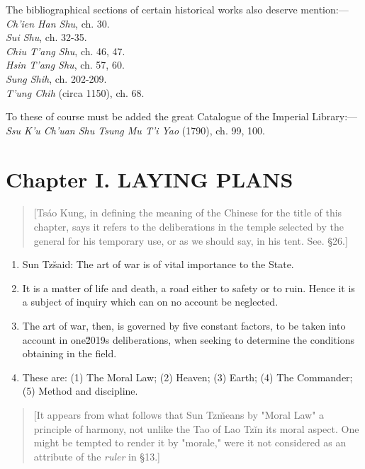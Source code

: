 \documentclass[10pt,a4paper]{book}
\begin{document}
The bibliographical sections of certain historical works also deserve mention:---
\noindent\textit{Ch’ien Han Shu}, ch. 30. \\
\textit{Sui Shu}, ch. 32-35. \\
\textit{Chiu T’ang Shu}, ch. 46, 47. \\
\textit{Hsin T’ang Shu}, ch. 57, 60. \\
\textit{Sung Shih}, ch. 202-209. \\
\textit{T’ung Chih} (circa 1150), ch. 68.

To these of course must be added the great Catalogue of the Imperial Library:--- \\
\indent\textit{Ssu K’u Ch’uan Shu Tsung Mu T’i Yao} (1790), ch. 99, 100.

\chapter{Chapter I. LAYING PLANS}

{\small
\begin{quote}
[Ts\'ao Kung, in defining the meaning of the Chinese for the title of this chapter, says it refers to the deliberations in the temple selected by the general for his temporary use, or as we should say, in his tent. See. \S 26.]
\end{quote}
}

\begin{enumerate}[leftmargin=*, label=\arabic*.]

\item Sun Tz\u said: The art of war is of vital importance to the State.

\item It is a matter of life and death, a road either to safety or to ruin. Hence it is a subject of inquiry which can on no account be neglected.

\item The art of war, then, is governed by five constant factors, to be taken into account in one\u2019s deliberations, when seeking to determine the conditions obtaining in the field.

\item These are: (1) The Moral Law; (2) Heaven; (3) Earth; (4) The Commander; (5) Method and discipline.

\end{enumerate}

{\small
\begin{quote}
[It appears from what follows that Sun Tz\u means by "Moral Law" a principle of harmony, not unlike the Tao of Lao Tz\u in its moral aspect. One might be tempted to render it by "morale," were it not considered as an attribute of the \textit{ruler} in \S 13.]
\end{quote}
}
\end{document}

